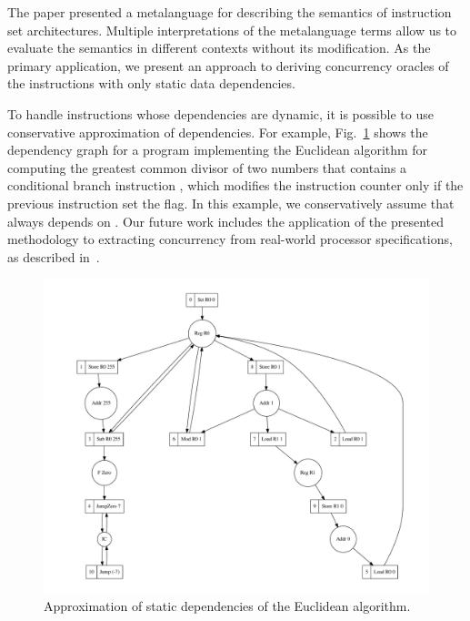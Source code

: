 
The paper presented a metalanguage for describing the semantics of instruction
set architectures. Multiple interpretations of the metalanguage terms allow us
to evaluate the semantics in different contexts without its modification. As the
primary application, we present an approach to deriving concurrency oracles of
the instructions with only static data dependencies.

To handle instructions whose dependencies are dynamic, it is possible to use
conservative approximation of dependencies. For example, Fig.~\ref{fig-sum}
shows the dependency graph for a program implementing the Euclidean algorithm
for computing the greatest common divisor of two numbers that contains
a conditional branch instruction , which modifies the instruction
counter  only if the previous instruction set the  flag. In this
example, we conservatively assume that  always depends on .
Our future work includes the application of the presented methodology to
extracting concurrency from real-world processor specifications, as described
in~\cite{mokhov2018formal}.

\vspace{-10mm}
\begin{figure}
\centerline{\includegraphics[scale=0.4]{img/gcd.pdf}}
\vspace{-7mm}
\caption{Approximation of static dependencies of the Euclidean algorithm.\label{fig-sum}}
\vspace{-10mm}
\end{figure}
